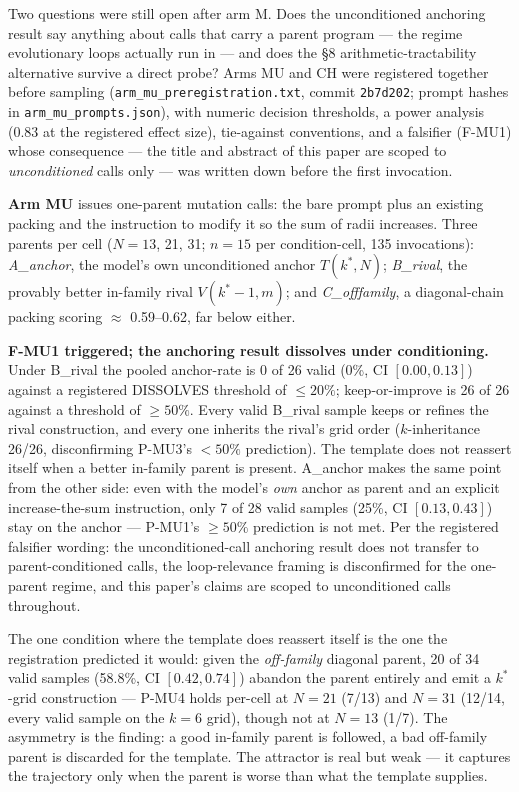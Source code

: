 Two questions were still open after arm M.
Does the unconditioned anchoring result say anything about calls that carry a parent
program --- the regime evolutionary loops actually run in --- and does the \S8
arithmetic-tractability alternative survive a direct probe? Arms MU and CH were registered
together before sampling (\texttt{arm\_mu\_preregistration.txt}, commit \texttt{2b7d202}; prompt hashes in
\texttt{arm\_mu\_prompts.json}), with numeric decision thresholds, a power analysis (0.83 at the
registered effect size), tie-against conventions, and a falsifier (F-MU1) whose consequence ---
the title and abstract of this paper are scoped to \emph{unconditioned} calls only --- was written
down before the first invocation.

\textbf{Arm MU} issues one-parent mutation calls: the bare prompt plus an existing packing and the
instruction to modify it so the sum of radii increases. Three parents per cell
($N = 13$, 21, 31; $n = 15$ per condition-cell, 135 invocations): \emph{A\_anchor}, the model's own
unconditioned anchor $T(k^*, N)$; \emph{B\_rival}, the provably better in-family rival $V(k^*{-}1, m)$;
and \emph{C\_offfamily}, a diagonal-chain packing scoring $\approx$ 0.59--0.62, far below either.

\textbf{F-MU1 triggered; the anchoring result dissolves under conditioning.} Under B\_rival the
pooled anchor-rate is 0 of 26 valid (0\%, CI $[0.00, 0.13]$) against a registered DISSOLVES
threshold of $\le 20\%$; keep-or-improve is 26 of 26 against a threshold of $\ge 50\%$. Every valid
B\_rival sample keeps or refines the rival construction, and every one inherits the rival's
grid order ($k$-inheritance 26/26, disconfirming P-MU3's $< 50\%$ prediction). The template does
not reassert itself when a better in-family parent is present. A\_anchor makes the same point
from the other side: even with the model's \emph{own} anchor as parent and an explicit
increase-the-sum instruction, only 7 of 28 valid samples (25\%, CI $[0.13, 0.43]$) stay on the
anchor --- P-MU1's $\ge 50\%$ prediction is not met. Per the registered falsifier wording: the
unconditioned-call anchoring result does not transfer to parent-conditioned calls, the
loop-relevance framing is disconfirmed for the one-parent regime, and this paper's claims are
scoped to unconditioned calls throughout.

The one condition where the template does reassert itself is the one the registration
predicted it would: given the \emph{off-family} diagonal parent, 20 of 34 valid samples (58.8\%,
CI $[0.42, 0.74]$) abandon the parent entirely and emit a $k^*$-grid construction --- P-MU4 holds
per-cell at $N = 21$ (7/13) and $N = 31$ (12/14, every valid sample on the $k = 6$ grid), though
not at $N = 13$ (1/7). The asymmetry is the finding: a good in-family parent is followed, a bad
off-family parent is discarded for the template. The attractor is real but weak --- it captures
the trajectory only when the parent is worse than what the template supplies.

